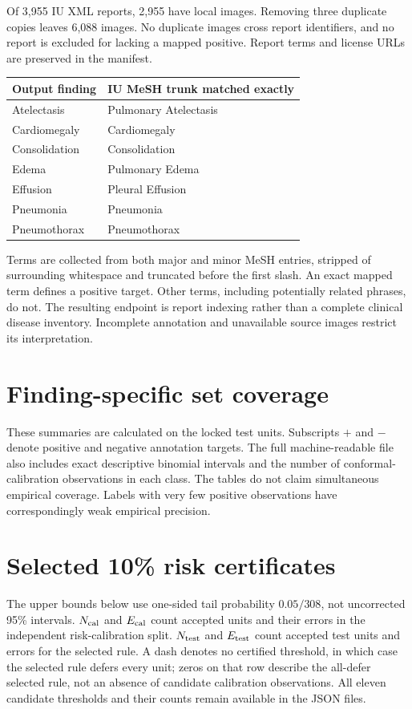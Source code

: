 \documentclass[10pt,a4paper]{article}
\begin{document}
Of 3,955 IU XML reports, 2,955 have local images. Removing three duplicate copies leaves 6,088 images. No duplicate images cross report identifiers, and no report is excluded for lacking a mapped positive. Report terms and license URLs are preserved in the manifest.

\begin{center}\begin{tabular}{ll}\toprule
Output finding & IU MeSH trunk matched exactly\\\midrule
Atelectasis & Pulmonary Atelectasis\\
Cardiomegaly & Cardiomegaly\\
Consolidation & Consolidation\\
Edema & Pulmonary Edema\\
Effusion & Pleural Effusion\\
Pneumonia & Pneumonia\\
Pneumothorax & Pneumothorax\\\bottomrule
\end{tabular}\end{center}
Terms are collected from both major and minor MeSH entries, stripped of surrounding whitespace and truncated before the first slash. An exact mapped term defines a positive target. Other terms, including potentially related phrases, do not. The resulting endpoint is report indexing rather than a complete clinical disease inventory. Incomplete annotation and unavailable source images restrict its interpretation.

\clearpage
\section{Finding-specific set coverage}
These summaries are calculated on the locked test units. Subscripts $+$ and $-$ denote positive and negative annotation targets. The full machine-readable file also includes exact descriptive binomial intervals and the number of conformal-calibration observations in each class. The tables do not claim simultaneous empirical coverage. Labels with very few positive observations have correspondingly weak empirical precision.


\clearpage
\section{Selected 10\% risk certificates}
The upper bounds below use one-sided tail probability $0.05/308$, not uncorrected 95\% intervals. $N_{\rm cal}$ and $E_{\rm cal}$ count accepted units and their errors in the independent risk-calibration split. $N_{\rm test}$ and $E_{\rm test}$ count accepted test units and errors for the selected rule. A dash denotes no certified threshold, in which case the selected rule defers every unit; zeros on that row describe the all-defer selected rule, not an absence of candidate calibration observations. All eleven candidate thresholds and their counts remain available in the JSON files.

\end{document}

